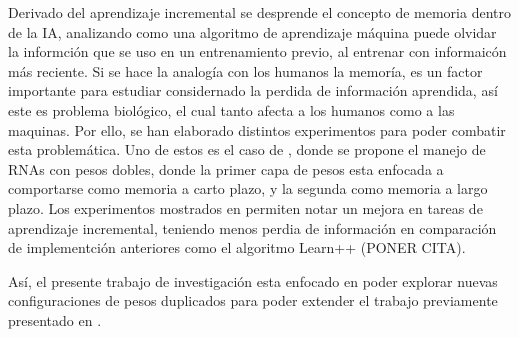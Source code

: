 Derivado del aprendizaje incremental se desprende el concepto de memoria dentro de la IA, analizando como una algoritmo de aprendizaje máquina puede olvidar la informción que se uso en un entrenamiento previo, al entrenar con informaicón más reciente. Si se hace la analogía con los humanos la memoría, es un factor importante para estudiar considernado la perdida de información aprendida, así este es problema biol\'ogico, el cual tanto afecta a los humanos como a las maquinas. Por ello, se han elaborado distintos experimentos para poder combatir esta problemática.  Uno de estos es el caso de \cite{bullinaria2009},  donde se propone el manejo de RNAs con pesos dobles,  donde la primer capa de pesos esta enfocada a comportarse como memoria a carto plazo, y la segunda como memoria a largo plazo.  Los experimentos mostrados en \cite{Bullinaria2009} permiten notar un mejora en tareas de aprendizaje incremental, teniendo menos perdia de información en comparación de implementción anteriores como el algoritmo  Learn++ (PONER CITA).

Así, el presente trabajo de investigación esta enfocado en poder explorar nuevas configuraciones de pesos duplicados para poder extender el trabajo previamente presentado en \cite{Bullinaria2009}.







